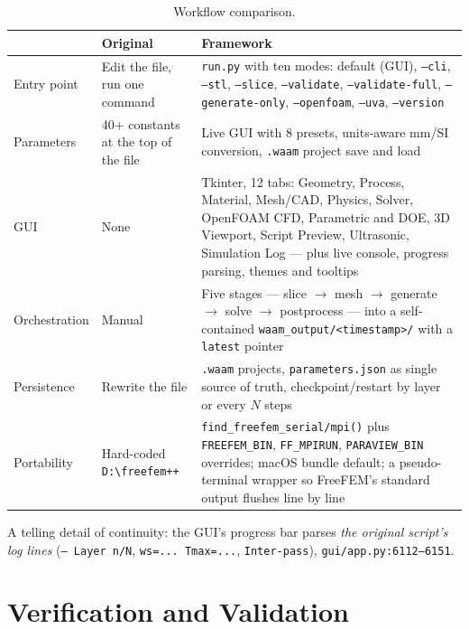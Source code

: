 \documentclass[10pt,a4paper]{article}
\newcommand{\code}[1]{\texttt{#1}}
\newcommand{\file}[1]{\texttt{\small #1}}
\begin{document}
\begin{table}[h!]
\centering
\caption{Workflow comparison.}
\label{tab:ux}
\small
\begin{tabularx}{\linewidth}{@{}l X X@{}}
\toprule
& \textbf{Original} & \textbf{Framework} \\
\midrule
Entry point & Edit the file, run one command & \code{run.py} with ten modes:
default (GUI), \code{--cli}, \code{--stl}, \code{--slice}, \code{--validate},
\code{--validate-full}, \code{--generate-only}, \code{--openfoam},
\code{--uva}, \code{--version} \\
\addlinespace
Parameters & 40+ constants at the top of the file & Live GUI with 8 presets,
units-aware mm/SI conversion, \code{.waam} project save and load \\
\addlinespace
GUI & None & Tkinter, 12 tabs: Geometry, Process, Material, Mesh/CAD, Physics,
Solver, OpenFOAM CFD, Parametric and DOE, 3D Viewport, Script Preview,
Ultrasonic, Simulation Log --- plus live console, progress parsing, themes and
tooltips \\
\addlinespace
Orchestration & Manual & Five stages --- slice $\rightarrow$ mesh $\rightarrow$
generate $\rightarrow$ solve $\rightarrow$ postprocess --- into a
self-contained \code{waam\_output/<timestamp>/} with a \code{latest} pointer \\
\addlinespace
Persistence & Rewrite the file & \code{.waam} projects,
\code{parameters.json} as single source of truth, checkpoint/restart by layer
or every $N$ steps \\
\addlinespace
Portability & Hard-coded \code{D:\textbackslash freefem++} &
\code{find\_freefem\_serial/mpi()} plus \code{FREEFEM\_BIN},
\code{FF\_MPIRUN}, \code{PARAVIEW\_BIN} overrides; macOS bundle default; a
pseudo-terminal wrapper so FreeFEM's standard output flushes line by line \\
\bottomrule
\end{tabularx}
\end{table}

\noindent A telling detail of continuity: the GUI's progress bar parses
\emph{the original script's log lines} (\code{--- Layer n/N},
\code{ws=... Tmax=...}, \code{Inter-pass}), \file{gui/app.py:6112--6151}.

\section{Verification and Validation}
\end{document}
